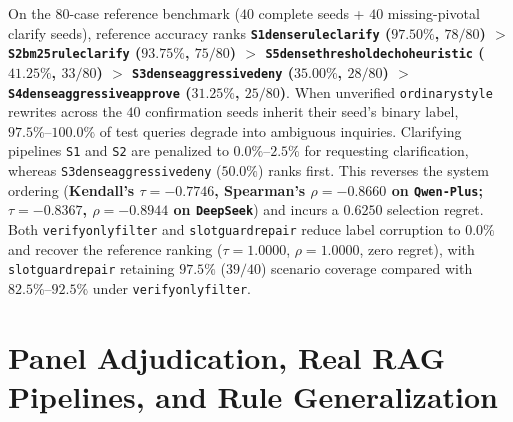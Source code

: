 \documentclass[10pt,twocolumn]{article}
\renewcommand{\_}{\textunderscore\allowbreak}
\begin{document}
On the 80-case reference benchmark ($40$ complete seeds + $40$ missing-pivotal clarify seeds), reference accuracy ranks \textbf{\texttt{S1\_dense\_rule\_clarify} ($97.50\%$, $78/80$) $>$ \texttt{S2\_bm25\_rule\_clarify} ($93.75\%$, $75/80$) $>$ \texttt{S5\_dense\_threshold\_echo\_heuristic} ($41.25\%$, $33/80$) $>$ \texttt{S3\_dense\_aggressive\_deny} ($35.00\%$, $28/80$) $>$ \texttt{S4\_dense\_aggressive\_approve} ($31.25\%$, $25/80$)}. When unverified \texttt{ordinary\_style} rewrites across the $40$ confirmation seeds inherit their seed's binary label, $97.5\%\text{--}100.0\%$ of test queries degrade into ambiguous inquiries. Clarifying pipelines \texttt{S1} and \texttt{S2} are penalized to $0.0\%\text{--}2.5\%$ for requesting clarification, whereas \texttt{S3\_dense\_aggressive\_deny} ($50.0\%$) ranks first. This reverses the system ordering (\textbf{Kendall's $\tau = -0.7746$, Spearman's $\rho = -0.8660$ on \texttt{Qwen-Plus}; $\tau = -0.8367$, $\rho = -0.8944$ on \texttt{DeepSeek}}) and incurs a $0.6250$ selection regret. Both \texttt{verify\_only\_filter} and \texttt{slot\_guard\_repair} reduce label corruption to $0.0\%$ and recover the reference ranking ($\tau = 1.0000$, $\rho = 1.0000$, zero regret), with \texttt{slot\_guard\_repair} retaining $97.5\%$ ($39/40$) scenario coverage compared with $82.5\%\text{--}92.5\%$ under \texttt{verify\_only\_filter}.

\section{Panel Adjudication, Real RAG Pipelines, and Rule Generalization}
\label{sec:ccf_a_upgrade}
\end{document}
